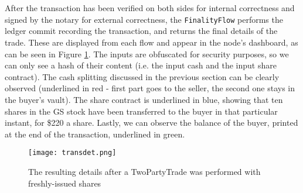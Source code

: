 \documentclass[12pt,twoside]{article}
\begin{document}
\\ \\
After the transaction has been verified on both sides for internal correctness and signed by the notary for external correctness, the \verb|FinalityFlow| performs the ledger commit recording the transaction, and returns the final details of the trade. These are displayed from each flow and appear in the node's dashboard, as can be seen in Figure \ref{fig:transactionDetails}. The inputs are obfuscated for security purposes, so we can only see a hash of their content (i.e. the input cash and the input share contract). The cash splitting discussed in the previous section can be clearly observed (underlined in red - first part goes to the seller, the second one stays in the buyer's vault). The share contract is underlined in blue, showing that ten shares in the GS stock have been transferred to the buyer in that particular instant, for \$220 a share. Lastly, we can observe the balance of the buyer, printed at the end of the transaction, underlined in green. 
\begin{figure}[!htb]
\centering
\texttt{[image: transdet.png]}
\caption{The resulting details after a TwoPartyTrade was performed with freshly-issued shares}
\centering
\label{fig:transactionDetails}
\end{figure}
\end{document}
